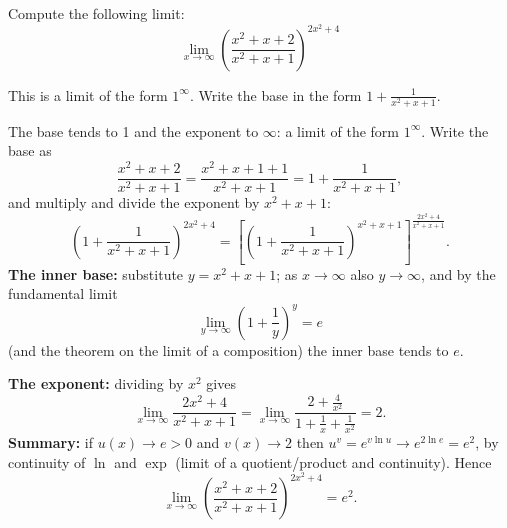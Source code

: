 
\begin{question}
Compute the following limit:
\[
\lim_{x\to\infty}\left(\frac{x^2+x+2}{x^2+x+1}\right)^{2x^2+4}
\]
\end{question}

\begin{hint}
This is a limit of the form $1^\infty$. Write the base in the form $1+\frac{1}{x^2+x+1}$.
\end{hint}

\begin{solution}
The base tends to 1 and the exponent to $\infty$: a limit of the form $1^\infty$. Write the base as
\[
\frac{x^2+x+2}{x^2+x+1}=\frac{x^2+x+1+1}{x^2+x+1}=1+\frac{1}{x^2+x+1},
\]
and multiply and divide the exponent by $x^2+x+1$:
\[
\left(1+\frac{1}{x^2+x+1}\right)^{2x^2+4}
=\left[\left(1+\frac{1}{x^2+x+1}\right)^{x^2+x+1}\right]^{\frac{2x^2+4}{x^2+x+1}} .
\]
\textbf{The inner base:} substitute $y=x^2+x+1$; as $x\to\infty$ also $y\to\infty$, and by the fundamental limit
\[
\lim_{y\to\infty}\left(1+\frac1y\right)^y=e
\]
(and the theorem on the limit of a composition) the inner base tends to $e$.

\textbf{The exponent:} dividing by $x^2$ gives
\[
\lim_{x\to\infty}\frac{2x^2+4}{x^2+x+1}=\lim_{x\to\infty}\frac{2+\frac4{x^2}}{1+\frac1x+\frac1{x^2}}=2 .
\]
\textbf{Summary:} if $u(x)\to e>0$ and $v(x)\to2$ then $u^v=e^{v\ln u}\to e^{2\ln e}=e^2$, by continuity of $\ln$ and $\exp$ (limit of a quotient/product and continuity). Hence
\[
\lim_{x\to\infty}\left(\frac{x^2+x+2}{x^2+x+1}\right)^{2x^2+4}=\boxed{e^2}.
\]
\end{solution}

